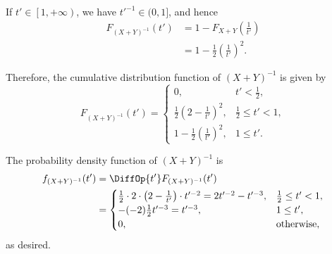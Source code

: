 \begin{enumerate}
          If \(t' \in \left[1, +\infty\right)\), we have \(t'^{-1} \in (0, 1]\), and hence
          \begin{align*}
              F_{(X + Y)^{-1}}(t') & = 1 - F_{X + Y}\left(\frac{1}{t'}\right)       \\
                                   & = 1 - \frac{1}{2} \left(\frac{1}{t'}\right)^2.
          \end{align*}

          Therefore, the cumulative distribution function of \((X + Y)^{-1}\) is given by
          \[
              F_{(X + Y)^{-1}}(t') = \begin{cases}
                  0,                                           & t' < \frac{1}{2},        \\
                  \frac{1}{2} \left(2 - \frac{1}{t'}\right)^2, & \frac{1}{2} \leq t' < 1, \\
                  1 - \frac{1}{2} \left(\frac{1}{t'}\right)^2, & 1 \leq t'.
              \end{cases}
          \]

          The probability density function of \((X + Y)^{-1}\) is
          \begin{align*}
              f_{(X + Y)^{-1}}(t') & = \DiffOp{t'} F_{(X + Y)^{-1}}(t')                                                                                        \\
                                   & = \begin{cases}
                                           \frac{1}{2} \cdot 2 \cdot \left(2 - \frac{1}{t'}\right) \cdot t'^{-2} = 2 t'^{-2} - t'^{-3}, & \frac{1}{2} \leq t' < 1, \\
                                           -(-2)\frac{1}{2} t'^{-3} = t'^{-3},                                                          & 1 \leq t',               \\
                                           0,                                                                                           & \text{otherwise},
                                       \end{cases}
          \end{align*}
          as desired.


\end{enumerate}
